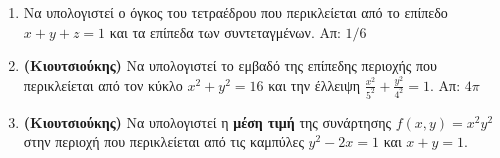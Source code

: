 \begin{enumerate}

  \item Να υπολογιστεί ο όγκος του τετραέδρου που περικλείεται από το 
    επίπεδο $x+y+z=1$ και τα επίπεδα των συντεταγμένων.  
    \hfill Απ: ${1}/{6}$ %

  \item \label{ask:area} 
    \textbf{(Κιουτσιούκης)} Να υπολογιστεί το εμβαδό της επίπεδης περιοχής που 
    περικλείεται από τον κύκλο $ x^{2}+y^{2} = 16 $ και την έλλειψη 
    $ \frac{x^{2}}{5^{2}} + \frac{y^{2}}{4^{2}} =1$. \hfill Απ: $ 4 \pi $ 

  \item 
    \textbf{(Κιουτσιούκης)} Να υπολογιστεί η \textbf{μέση τιμή} της συνάρτησης 
    $ f(x,y) = x^{2}y^{2} $ στην περιοχή που περικλείεται από τις καμπύλες 
    $ y^{2}-2x=1 $ και $ x+y=1 $. 
\end{enumerate}

\vspace{\baselineskip}

\begin{center}
  \minibox{\large\bf \textcolor{Col1}{Υποδείξεις}}
\end{center}

\vspace{\baselineskip}

